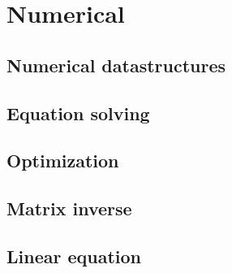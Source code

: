 
\chapter{Numerical}

	\section{Numerical datastructures}

	\section{Equation solving}

	\section{Optimization}

	\section{Matrix inverse}

	\section{Linear equation}
